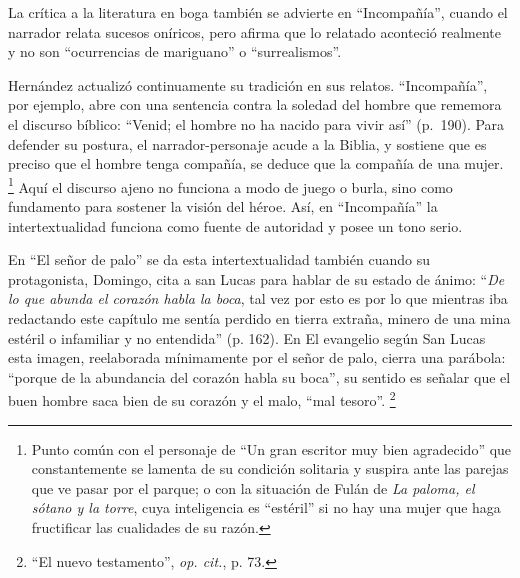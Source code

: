 \documentclass[14pt,twoside,final]{extbook} %
\let\oldfootnote\footnote
\renewcommand\footnote[1]{%
\oldfootnote{\hspace{1mm}#1}}
\begin{document}
La crítica a la literatura en boga también se advierte en ``Incompañía'', cuando el narrador relata sucesos oníricos, pero afirma que lo relatado aconteció realmente y no son ``ocurrencias de mariguano'' o ``surrealismos''.

Hernández actualizó continuamente su tradición en sus relatos. ``Incompañía'', por ejemplo, abre con una sentencia contra la soledad del hombre que rememora el discurso bíblico: ``Venid; el hombre no ha nacido para vivir así'' (p.~190). Para defender su postura, el narrador-personaje acude a la Biblia, y sostiene que es preciso que el hombre tenga compañía, se deduce que la compañía de una mujer.\footnote{Punto común con el personaje de ``Un gran escritor muy bien agradecido'' que constantemente se lamenta de su condición solitaria y suspira ante las parejas que ve pasar por el parque; o con la situación de Fulán de \emph{La paloma, el sótano y la torre}, cuya inteligencia es ``estéril'' si no hay una mujer que haga fructificar las cualidades de su razón.} Aquí el discurso ajeno no funciona a modo de juego o burla, sino como fundamento para sostener la visión del héroe. Así, en ``Incompañía'' la intertextualidad funciona como fuente de autoridad y posee un tono serio.

En ``El señor de palo'' se da esta intertextualidad también cuando su protagonista, Domingo, cita a san Lucas para hablar de su estado de ánimo: ``\emph{De lo que abunda el corazón habla la boca}, tal vez por esto es por lo que mientras iba redactando este capítulo me sentía perdido en tierra extraña, minero de una mina estéril o infamiliar y no entendida'' (p. 162). En El evangelio según San Lucas esta imagen, reelaborada mínimamente por el señor de palo, cierra una parábola: ``porque de la abundancia del corazón habla su boca'', su sentido es señalar que el buen hombre saca bien de su corazón y el malo, ``mal tesoro''.\footnote{``El nuevo testamento'', \emph{op. cit.}, p. 73.}
\end{document}
